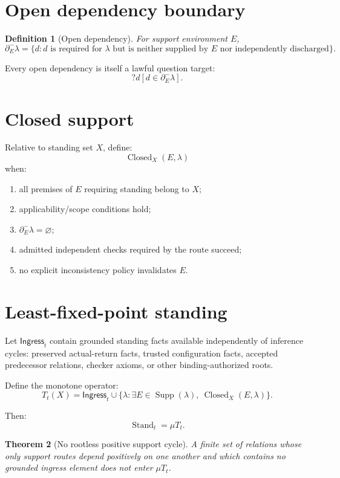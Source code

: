 \documentclass[11pt,oneside]{article}
\newtheorem{definition}{Definition}[section]
\newtheorem{theorem}[definition]{Theorem}
\newcommand{\Stand}{\operatorname{Stand}}
\newcommand{\Supp}{\operatorname{Supp}}
\newcommand{\Closed}{\operatorname{Closed}}
\begin{document}
\section{Open dependency boundary}

\begin{definition}[Open dependency]
For support environment \(E\),
\[
\boxed{
\partial^-_E\lambda
=
\{
d:
d\text{ is required for }\lambda
\text{ but is neither supplied by }E
\text{ nor independently discharged}
\}.
}
\]
\end{definition}

Every open dependency is itself a lawful question target:
\[
\boxed{
?d[
d\in\partial^-_E\lambda
].
}
\]

\section{Closed support}

Relative to standing set \(X\), define:
\[
\Closed_X(E,\lambda)
\]
when:
\begin{enumerate}
\item all premises of \(E\) requiring standing belong to \(X\);
\item applicability/scope conditions hold;
\item \(\partial^-_E\lambda=\varnothing\);
\item admitted independent checks required by the route succeed;
\item no explicit inconsistency policy invalidates \(E\).
\end{enumerate}

\section{Least-fixed-point standing}

Let \(\mathsf{Ingress}_t\) contain grounded standing facts available independently of inference cycles: preserved actual-return facts, trusted configuration facts, accepted predecessor relations, checker axioms, or other binding-authorized roots.

Define the monotone operator:
\[
\boxed{
T_t(X)
=
\mathsf{Ingress}_t
\cup
\{
\lambda:
\exists E\in\Supp(\lambda),\
\Closed_X(E,\lambda)
\}.
}
\]

Then:
\[
\boxed{
\Stand_t
=
\mu T_t.
}
\]

\begin{theorem}[No rootless positive support cycle]
A finite set of relations whose only support routes depend positively on one another and which contains no grounded ingress element does not enter \(\mu T_t\).
\end{theorem}
\end{document}

